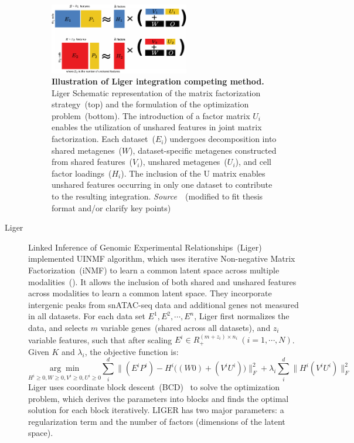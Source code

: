 \begin{description}
 \begin{figure}[!h]
  	\centering
  	\includegraphics[width=0.6\textwidth]{Alg_Liger/fig}
  	\vspace{0.1cm}
  	\caption[Illustration of Liger integration competing method.]{\textbf{Illustration of Liger integration competing method.} Liger Schematic representation of the matrix factorization strategy~(top) and the formulation of the optimization problem~(bottom). The introduction of a factor matrix $U_i$ enables the utilization of unshared features in joint matrix factorization. Each dataset~($E_i$) undergoes decomposition into shared metagenes~($W$), dataset-specific metagenes constructed from shared features~($V_i$), unshared metagenes~($U_i$), and cell factor loadings~($H_i$). The inclusion of the U matrix enables unshared features occurring in only one dataset to contribute to the resulting integration. \emph{Source~\cite{kriebel2022uinmf}}~(modified to fit thesis format and/or clarify key points)
  }
  	\label{fig:Alg_Liger}
 \end{figure}

  \item[Liger]
  Linked Inference of Genomic Experimental Relationships~(Liger)~\citep{kriebel2022uinmf} implemented UINMF algorithm, which uses iterative Non-negative Matrix Factorization~(iNMF) to learn a common latent space across multiple modalities~(). It allows the inclusion of both shared and unshared features across modalities to learn a common latent space. They incorporate intergenic peaks from snATAC-seq data and additional genes not measured in all datasets. For each data set $E^1, E^2, \cdots, E^n$, Liger first normalizes the data, and selects $m$ variable genes~(shared across all datasets), and $z_i$ variable features, such that after scaling $E^i \in R_{+}^{(m+z_i)\times n_i}\ (i=1,\cdots,N)$. Given $K$ and $\lambda_i$, the objective function is:
  \begin{equation}
	  \underset{H^i\geq 0,W\geq 0, V^i\geq 0, U^i \geq 0}{\arg\min} \sum_i^{d}\Big\| (E^i P^i) - H^i \big((W 0) + (V^i U^i)\big)\Big\|_{F}^2 + \lambda_i\sum_i^d\Big\|H^i(V^i U^i)\Big\|_{F}^2
  \end{equation}
  Liger uses coordinate block descent~(BCD)~\citep{kim2014algorithms} to solve the optimization problem, which derives the parameters into blocks and finds the optimal solution for each block iteratively. LIGER has two major parameters: a regularization term and the number of factors (dimensions of the latent space).



\end{description}

